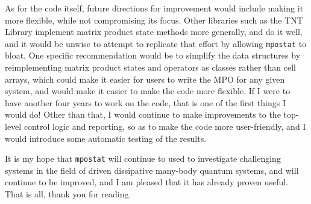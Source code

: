 As for the code itself, future directions for improvement would include making it more flexible, while not compromising its focus. Other libraries such as the TNT Library \cite{TNTlib,Al-Assam2017} implement matrix product state methods more generally, and do it well, and it would be unwise to attempt to replicate that effort by allowing \lstinline$mpostat$ to bloat. One specific recommendation would be to simplify the data structures by reimplementing matrix product states and operators as classes rather than cell arrays, which could make it easier for users to write the MPO for any given system, and would make it easier to make the code more flexible. If I were to have another four years to work on the code, that is one of the first things I would do! Other than that, I would continue to make improvements to the top-level control logic and reporting, so as to make the code more user-friendly, and I would introduce some automatic testing of the results. 

It is my hope that \lstinline$mpostat$ will continue to used to investigate challenging systems in the field of driven dissipative many-body quantum systems, and will continue to be improved, and I am pleased that it has already proven useful. That is all, thank you for reading.